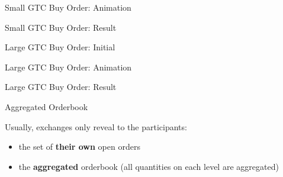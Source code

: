 \begin{frame}{Small GTC Buy Order: Animation}
  \begin{center}
  \end{center}
\end{frame}

\begin{frame}{Small GTC Buy Order: Result}
  \begin{center}
    
  \end{center}
\end{frame}

\begin{frame}{Large GTC Buy Order: Initial}
  \begin{center}
    
  \end{center}
\end{frame}

\begin{frame}{Large GTC Buy Order: Animation}
  \begin{center}
  \end{center}
\end{frame}

\begin{frame}{Large GTC Buy Order: Result}
  \begin{center}
    
  \end{center}
\end{frame}

\begin{frame}{Aggregated Orderbook}
  \begin{sqt:result}
    Usually, exchanges only reveal to the participants:
    \begin{itemize}
      \item the set of \textbf{their own} open orders
      \item the \textbf{aggregated} orderbook (all quantities on each level are aggregated)
    \end{itemize}
  \end{sqt:result}

  \begin{center}
    
  \end{center}
\end{frame}

